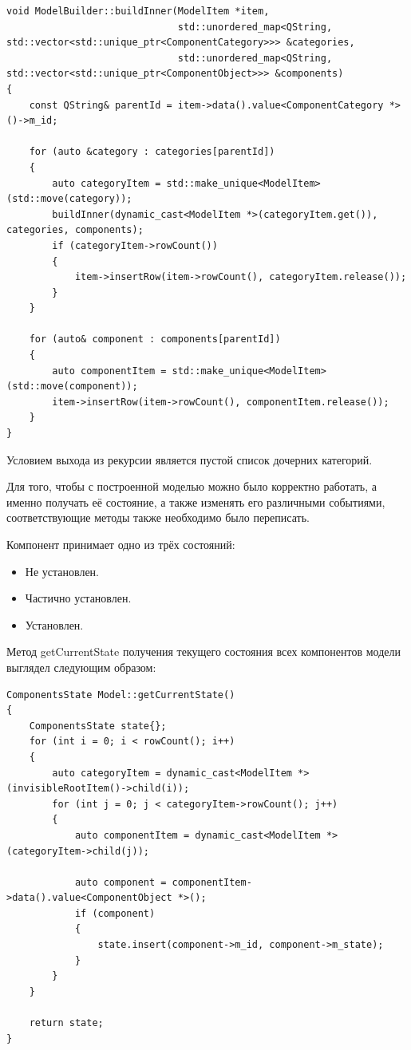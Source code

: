 \documentclass[bachelor, och, pract]{SCWorks}
\begin{document}
\begin{verbatim}
void ModelBuilder::buildInner(ModelItem *item,
                              std::unordered_map<QString, std::vector<std::unique_ptr<ComponentCategory>>> &categories,
                              std::unordered_map<QString, std::vector<std::unique_ptr<ComponentObject>>> &components)
{
    const QString& parentId = item->data().value<ComponentCategory *>()->m_id;
    
    for (auto &category : categories[parentId])
    {
        auto categoryItem = std::make_unique<ModelItem>(std::move(category));
        buildInner(dynamic_cast<ModelItem *>(categoryItem.get()), categories, components);
        if (categoryItem->rowCount()) 
        {
            item->insertRow(item->rowCount(), categoryItem.release());
        }
    }
    
    for (auto& component : components[parentId])
    {
        auto componentItem = std::make_unique<ModelItem>(std::move(component));
        item->insertRow(item->rowCount(), componentItem.release());
    }
}
\end{verbatim}

Условием выхода из рекурсии является пустой список дочерних категорий.

Для того, чтобы с построенной моделью можно было корректно работать, а именно получать её состояние, а также изменять его различными событиями, соответствующие методы также необходимо было переписать.

Компонент принимает одно из трёх состояний:

\begin{itemize}
    \item Не установлен.
    \item Частично установлен.
    \item Установлен.
\end{itemize}

Метод getCurrentState получения текущего состояния всех компонентов модели выглядел следующим образом:

\begin{verbatim}
ComponentsState Model::getCurrentState()
{
    ComponentsState state{};
    for (int i = 0; i < rowCount(); i++)
    {
        auto categoryItem = dynamic_cast<ModelItem *>(invisibleRootItem()->child(i));
        for (int j = 0; j < categoryItem->rowCount(); j++)
        {
            auto componentItem = dynamic_cast<ModelItem *>(categoryItem->child(j));

            auto component = componentItem->data().value<ComponentObject *>();
            if (component)
            {
                state.insert(component->m_id, component->m_state);
            }
        }
    }

    return state;
}
\end{verbatim}
\end{document}
